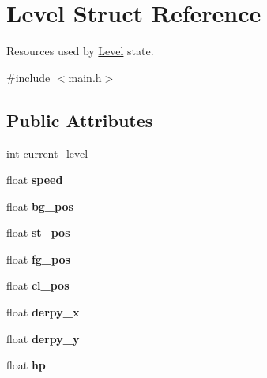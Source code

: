 \hypertarget{structLevel}{\section{\-Level \-Struct \-Reference}
\label{structLevel}
}


\-Resources used by \hyperlink{structLevel}{\-Level} state.  




{\ttfamily \#include $<$main.\-h$>$}

\subsection*{\-Public \-Attributes}
\begin{DoxyCompactItemize}
\item 
int \hyperlink{structLevel_a1ba3ee0104c912dde5d6e70fee889512}{current\-\_\-level}
\item 
\hypertarget{structLevel_a936a1d131d1e056878474ca831c5e88f}{float {\bfseries speed}}\label{structLevel_a936a1d131d1e056878474ca831c5e88f}

\item 
\hypertarget{structLevel_a00321214fdc30f67615053d1ca614948}{float {\bfseries bg\-\_\-pos}}\label{structLevel_a00321214fdc30f67615053d1ca614948}

\item 
\hypertarget{structLevel_ab13f799d9e2e06a04debbd97676fb512}{float {\bfseries st\-\_\-pos}}\label{structLevel_ab13f799d9e2e06a04debbd97676fb512}

\item 
\hypertarget{structLevel_a665bb93951ab6b7a91543712152a3acf}{float {\bfseries fg\-\_\-pos}}\label{structLevel_a665bb93951ab6b7a91543712152a3acf}

\item 
\hypertarget{structLevel_af466533be369b5ce1f48196a7f3b7b0b}{float {\bfseries cl\-\_\-pos}}\label{structLevel_af466533be369b5ce1f48196a7f3b7b0b}

\item 
\hypertarget{structLevel_ae5a97d5b61c70c63e93992a9ff3935f9}{float {\bfseries derpy\-\_\-x}}\label{structLevel_ae5a97d5b61c70c63e93992a9ff3935f9}

\item 
\hypertarget{structLevel_a7b3c0f5af134797a1ed21ef48da3ab00}{float {\bfseries derpy\-\_\-y}}\label{structLevel_a7b3c0f5af134797a1ed21ef48da3ab00}

\item 
\hypertarget{structLevel_a49df009e8113251cfcb48fe17df0b571}{float {\bfseries hp}}\label{structLevel_a49df009e8113251cfcb48fe17df0b571}


\end{DoxyCompactItemize}
